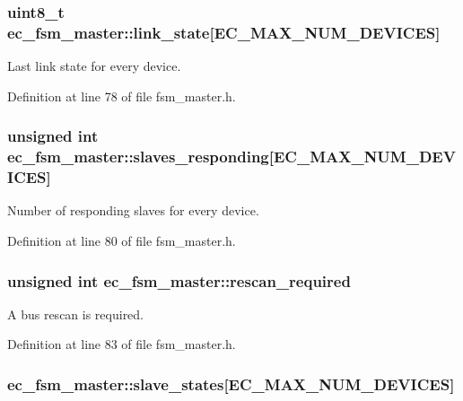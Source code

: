 \subsubsection[{link\-\_\-state}]{\setlength{\rightskip}{0pt plus 5cm}uint8\-\_\-t ec\-\_\-fsm\-\_\-master\-::link\-\_\-state[E\-C\-\_\-\-M\-A\-X\-\_\-\-N\-U\-M\-\_\-\-D\-E\-V\-I\-C\-E\-S]}\label{structec__fsm__master_a6b0de3d8e619c6937679b6e746dd3c1f}


Last link state for every device. 



Definition at line 78 of file fsm\-\_\-master.\-h.

\subsubsection[{slaves\-\_\-responding}]{\setlength{\rightskip}{0pt plus 5cm}unsigned int ec\-\_\-fsm\-\_\-master\-::slaves\-\_\-responding[E\-C\-\_\-\-M\-A\-X\-\_\-\-N\-U\-M\-\_\-\-D\-E\-V\-I\-C\-E\-S]}\label{structec__fsm__master_a0e6fafb6571a8c72ef75d37b335f168c}


Number of responding slaves for every device. 



Definition at line 80 of file fsm\-\_\-master.\-h.

\subsubsection[{rescan\-\_\-required}]{\setlength{\rightskip}{0pt plus 5cm}unsigned int ec\-\_\-fsm\-\_\-master\-::rescan\-\_\-required}\label{structec__fsm__master_a173d3201cbfb35d29ff02788d7396839}


A bus rescan is required. 



Definition at line 83 of file fsm\-\_\-master.\-h.

\subsubsection[{slave\-\_\-states}]{ ec\-\_\-fsm\-\_\-master\-::slave\-\_\-states[E\-C\-\_\-\-M\-A\-X\-\_\-\-N\-U\-M\-\_\-\-D\-E\-V\-I\-C\-E\-S]}\label{structec__fsm__master_a76906b5cbaec1d07e5881738a6ce008e}


